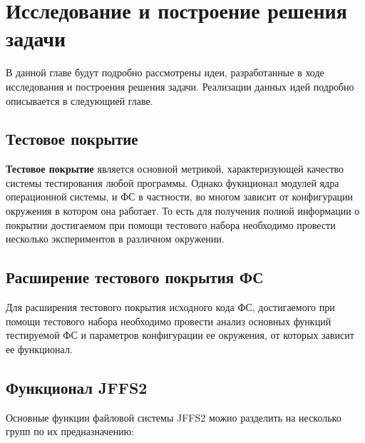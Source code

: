 \section{Исследование и построение решения задачи}
\label{sec:Chapter3} 

В данной главе будут подробно рассмотрены идеи, разработанные в ходе исследования и построения решения задачи. Реализации данных идей подробно описывается в следующией главе.

\subsection{Тестовое покрытие}

\textbf{Тестовое покрытие} является основной метрикой, характеризующей качество системы тестирования любой программы. Однако фукнционал модулей ядра операционной системы, и ФС в частности, во многом зависит от конфигурации окружения в котором она работает. То есть для получения полной информации о покрытии достигаемом при помощи тестового набора необходимо провести несколько экспериментов в различном окружении.

\subsection{Расширение тестового покрытия ФС}

Для расширения тестового покрытия исходного кода ФС, достигаемого при помощи тестового набора необходимо провести анализ основных функций тестируемой ФС и параметров конфигурации ее окружения, от которых зависит ее функционал.

\subsection{Функционал JFFS2}

Основные функции файловой системы JFFS2 можно разделить на несколько групп по их предназначению:

